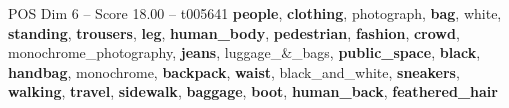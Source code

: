 \begin{textsample}{POS Dim 6 – Score 18.00 – t005641}  \label{ex:f6_pos_008}
\textbf{people}, \textbf{clothing}, photograph, \textbf{bag}, white, \textbf{standing}, \textbf{trousers}, \textbf{leg}, \textbf{human\_body}, \textbf{pedestrian}, \textbf{fashion}, \textbf{crowd}, monochrome\_photography, \textbf{jeans}, luggage\_\&\_bags, \textbf{public\_space}, \textbf{black}, \textbf{handbag}, monochrome, \textbf{backpack}, \textbf{waist}, black\_and\_white, \textbf{sneakers}, \textbf{walking}, \textbf{travel}, \textbf{sidewalk}, \textbf{baggage}, \textbf{boot}, \textbf{human\_back}, \textbf{feathered\_hair}

\end{textsample}
